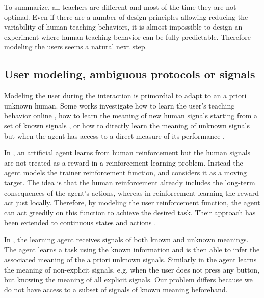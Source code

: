 \transition

To summarize, all teachers are different and most of the time they are not optimal. Even if there are a number of design principles allowing reducing the variability of human teaching behaviors, it is almost impossible to design an experiment where human teaching behavior can be fully predictable. Therefore modeling the users seems a natural next step.

\subsection{User modeling, ambiguous protocols or signals}


Modeling the user during the interaction is primordial to adapt to an a priori unknown human. Some works investigate how to learn the user's teaching behavior online \cite{knox2009interactively}, how to learn the meaning of new human signals starting from a set of known signals \cite{macl11simul,loftinlearning}, or how to directly learn the meaning of unknown signals but when the agent has access to a direct measure of its performance \cite{branavan2011learning,kim2012unsupervised,doshi2008spoken}.

In \cite{knox2009interactively}, an artificial agent learns from human reinforcement but the human signals are not treated as a reward in a reinforcement learning problem. Instead the agent models the trainer reinforcement function, and considers it as a moving target. The idea is that the human reinforcement already includes the long-term consequences of the agent's actions, whereas in reinforcement learning the reward act just locally. Therefore, by modeling the user reinforcement function, the agent can act greedily on this function to achieve the desired task. Their approach has been extended to continuous states and actions \cite{vien2013learning}.

In \cite{macl11simul}, the learning agent receives signals of both known and unknown meanings. The agent learns a task using the known information and is then able to infer the associated meaning of the a priori unknown signals. Similarly in \cite{loftinlearning} the agent learns the meaning of non-explicit signals, e.g. when the user does not press any button, but knowing the meaning of all explicit signals. Our problem differs because we do not have access to a subset of signals of known meaning beforehand.

